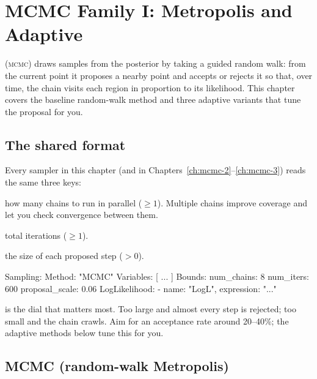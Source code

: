 \chapter{MCMC Family I: Metropolis and Adaptive}
\label{ch:mcmc-1}

 (\textsc{mcmc}) draws samples from the posterior by taking a
guided random walk: from the current point it proposes a nearby point and accepts or rejects it so
that, over time, the chain visits each region in proportion to its likelihood. This chapter covers
the baseline random-walk method and three adaptive variants that tune the proposal for you.

\section{The shared format}
\label{sec:mcmc1-format}

Every sampler in this chapter (and in Chapters~\ref{ch:mcmc-2}--\ref{ch:mcmc-3}) reads the same
three  keys:

\begin{description}[style=nextline, leftmargin=1.2em]
  \item[\yamlkey{num\_chains}] how many chains to run in parallel ($\geq 1$). Multiple chains
        improve coverage and let you check convergence between them.
  \item[\yamlkey{num\_iters}] total iterations ($\geq 1$).
  \item[\yamlkey{proposal\_scale}] the size of each proposed step ($>0$).
\end{description}

\begin{yamlwin}
Sampling:
  Method: "MCMC"
  Variables: [ ... ]
  Bounds:
    num_chains: 8
    num_iters: 600
    proposal_scale: 0.06
  LogLikelihood:
    - {name: "LogL", expression: "..."}
\end{yamlwin}

\begin{jtip}
 is the dial that matters most. Too large and almost every step is
rejected; too small and the chain crawls. Aim for an acceptance rate around 20--40\%; the adaptive
methods below tune this for you.
\end{jtip}

\section{MCMC (random-walk Metropolis)}
\label{sec:s-mcmc}

